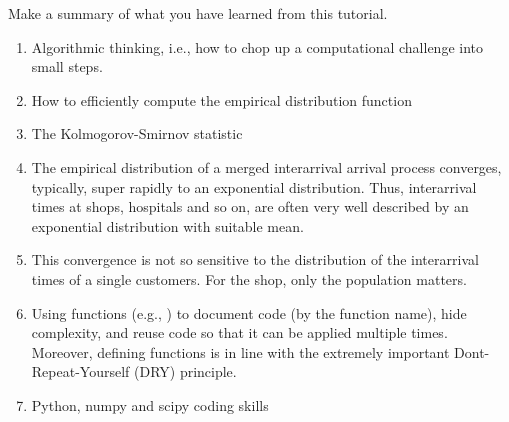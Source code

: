 \documentclass{scrartcl}
\begin{document}
\begin{exercise}
  Make a summary of what you have learned from this tutorial.
  \begin{solution}
    \begin{enumerate}
    \item Algorithmic thinking, i.e., how to chop up a computational challenge into small steps.
    \item How to efficiently compute the empirical distribution function
    \item The Kolmogorov-Smirnov statistic
    \item The empirical distribution of a  merged interarrival arrival process converges, typically, super rapidly to an exponential distribution. Thus,  interarrival times at shops, hospitals and so on, are often very well described by an exponential distribution with suitable mean. 
    \item This convergence is not so sensitive to the distribution of the interarrival times of a single customers. For the shop, only the population matters. 
    \item Using functions (e.g., )  to document code  (by the function name), hide complexity, and reuse code so that it can be applied multiple times. Moreover, defining functions is in line with the extremely important Dont-Repeat-Yourself (DRY) principle. 
    \item Python, numpy and scipy coding skills
    \end{enumerate}
  \end{solution}
\end{exercise}







\end{document}
